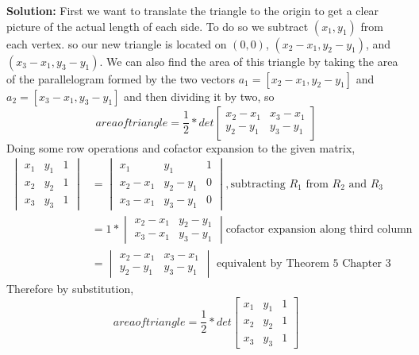 \documentclass{amsart}
\begin{document}
\noindent \textbf{Solution: } First we want to translate the triangle to the origin to get a clear picture of the actual length of each side. To do so we subtract  $(x_1,y_1)$ from each vertex. so our new triangle is located on $(0,0)$, $(x_2 - x_1,y_2 - y_1)$, and $(x_3 - x_1,y_3 - y_1)$. We can also find the area of this triangle by taking the area of the parallelogram formed by the two vectors $a_1 = [x_2 - x_1, y_2 - y_1]$ and $a_2 = [x_3 - x_1, y_3 - y_1]$ and then dividing it by two, so
\begin{equation*}
{area of triangle} =  \frac{1}{2}*det
\begin{bmatrix}
x_2 - x_1&x_3 - x_1\\
y_2 - y_1&y_3 - y_1
\end{bmatrix}
\end{equation*}
Doing some row operations and cofactor expansion to the given matrix,
\begin{align*}
{
\begin{vmatrix}
x_1&y_1&1\\
x_2&y_2&1\\
x_3&y_3&1
\end{vmatrix}}
&= 
{
\begin{vmatrix}
x_1&y_1&1\\
x_2 - x_1&y_2 - y_1&0\\
x_3 - x_1&y_3 - y_1&0
\end{vmatrix} , \text{subtracting $R_1$ from $R_2$ and $R_3$}}\\
&=1*
\begin{vmatrix}
x_2 - x_1&y_2 - y_1\\
x_3 - x_1&y_3 - y_1
\end{vmatrix}  \text{cofactor expansion along third column}\\
& =
\begin{vmatrix}
x_2 - x_1&x_3 - x_1\\
y_2 - y_1&y_3 - y_1
\end{vmatrix}\text{ equivalent by Theorem 5 Chapter 3}
\end{align*}
Therefore by substitution,
\begin{equation*}
{area of triangle} = \frac{1}{2}*det
\begin{bmatrix}
x_1&y_1&1\\
x_2&y_2&1\\
x_3&y_3&1
\end{bmatrix}
\end{equation*}
 
\vspace{1in}
\end{document}
